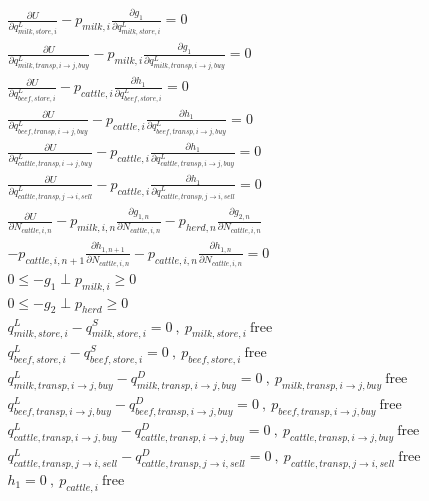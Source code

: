 \documentclass[letter,12pt]{article}
\begin{document}
\begin{gather}
\frac{\partial U}{\partial q_{milk,store,i}^L} - p_{milk,i} \frac{\partial g_1}{\partial q_{milk,store,i}^L} = 0\\
\frac{\partial U}{\partial q_{milk,transp,i \rightarrow j,buy}^L} - p_{milk,i} \frac{\partial g_1}{\partial q_{milk,transp,i \rightarrow j,buy}^L} = 0\\
\frac{\partial U}{\partial q_{beef,store,i}^L} - p_{cattle,i} \frac{\partial h_1}{\partial q_{beef,store,i}^L} = 0\\
\frac{\partial U}{\partial q_{beef,transp,i \rightarrow j,buy}^L} - p_{cattle,i} \frac{\partial h_1}{\partial q_{beef,transp,i \rightarrow j,buy}^L} = 0\\
\frac{\partial U}{\partial q_{cattle,transp,i \rightarrow j,buy}^L} - p_{cattle,i} \frac{\partial h_1}{\partial q_{cattle,transp,i \rightarrow j,buy}^L} = 0 \\
\frac{\partial U}{\partial q_{cattle,transp,j \rightarrow i,sell}^L} - p_{cattle,i} \frac{\partial h_1}{\partial q_{cattle,transp,j \rightarrow i,sell}^L}  = 0 \\
\frac{\partial U}{\partial N_{cattle,i,n}} - p_{milk,i,n} \frac{\partial g_{1,n}}{\partial N_{cattle,i,n}} - p_{herd,n} \frac{\partial g_{2,n}}{\partial N_{cattle,i,n}} \nonumber \\
- p_{cattle,i,n+1} \frac{\partial h_{1,n+1}}{\partial N_{cattle,i,n}} - p_{cattle,i,n} \frac{\partial h_{1,n}}{\partial N_{cattle,i,n}} = 0\\
0 \leq -g_1 \perp p_{milk,i} \geq 0 \\
0 \leq -g_2 \perp p_{herd} \geq 0 \\
q_{milk,store,i}^L - q_{milk,store,i}^S = 0 \ , \ p_{milk,store,i} \ \text{free} \\
q_{beef,store,i}^L - q_{beef,store,i}^S = 0 \ , \ p_{beef,store,i} \ \text{free} \\
q_{milk,transp,i \rightarrow j,buy}^L - q_{milk,transp,i \rightarrow j,buy}^D = 0 \ , \ p_{milk,transp,i \rightarrow j,buy} \ \text{free} \\
q_{beef,transp,i \rightarrow j,buy}^L - q_{beef,transp,i \rightarrow j,buy}^D = 0 \ , \ p_{beef,transp,i \rightarrow j,buy} \ \text{free} \\
q_{cattle,transp,i \rightarrow j,buy}^L - q_{cattle,transp,i \rightarrow j,buy}^D = 0 \ , \ p_{cattle,transp,i \rightarrow j,buy} \ \text{free} \\
q_{cattle,transp,j \rightarrow i,sell}^L - q_{cattle,transp,j \rightarrow i,sell}^D = 0 \ , \ p_{cattle,transp,j \rightarrow i,sell} \ \text{free} \\
h_1 = 0 \ , \ p_{cattle,i} \ \text{free}
\end{gather}
\end{document}
